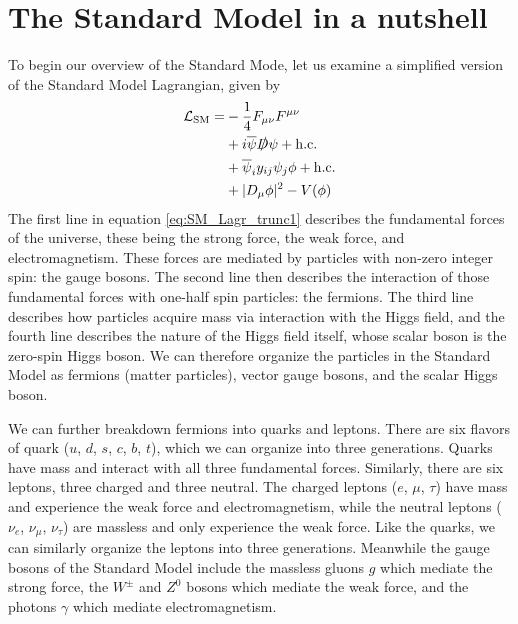 \section{The Standard Model in a nutshell}\label{sec:standard_model_fields}
To begin our overview of the Standard Mode, let us examine a simplified version of the Standard Model Lagrangian, given by
\begin{equation}\label{eq:SM_Lagr_trunc1}
\begin{split}
 \mathcal{L}_\mathrm{SM} = &-\frac{1}{4}F_{\mu\nu}F^{\mu\nu} \\ 
        &+ i\overline{\psi}\slashed{D}\psi + \mathrm{h.c.} \\
        &+ \overline{\psi}_iy_{ij}\psi_j\phi + \mathrm{h.c.} \\
        &+|D_\mu\phi|^2 - V(\phi)
\end{split}
\end{equation}
The first line in equation \ref{eq:SM_Lagr_trunc1} describes the fundamental forces of the universe, these being the strong force, the weak force, and electromagnetism.  These forces are mediated by particles with non-zero integer spin: the gauge bosons.  The second line then describes the interaction of those fundamental forces with one-half spin particles: the fermions.  The third line describes how particles acquire mass via interaction with the Higgs field, and the fourth line describes the nature of the Higgs field itself, whose scalar boson is the zero-spin Higgs boson.  We can therefore organize the particles in the Standard Model as fermions (matter particles), vector gauge bosons, and the scalar Higgs boson.  

We can further breakdown fermions into quarks and leptons.  There are six flavors of quark ($u$, $d$, $s$, $c$, $b$, $t$), which we can organize into three generations.  Quarks have mass and interact with all three fundamental forces.  Similarly, there are six leptons, three charged and three neutral.  The charged leptons ($e$, $\mu$, $\tau$) have mass and experience the weak force and electromagnetism, while the neutral leptons ($\nu_e$, $\nu_\mu$, $\nu_\tau$) are massless and only experience the weak force. Like the quarks, we can similarly organize the leptons into three generations.  Meanwhile the gauge bosons of the Standard Model include the massless gluons $g$ which mediate the strong force, the $W^\pm$ and $Z^0$ bosons which mediate the weak force, and the photons $\gamma$ which mediate electromagnetism.

